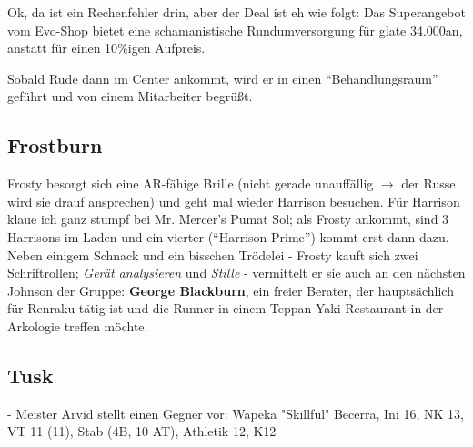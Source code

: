 Ok, da ist ein Rechenfehler drin, aber der Deal ist eh wie folgt: Das Superangebot vom Evo-Shop bietet eine schamanistische Rundumversorgung für glate 34.000\nuyen an, anstatt für einen 10\%igen Aufpreis.

Sobald Rude dann im Center ankommt, wird er in einen ``Behandlungsraum'' geführt und von einem Mitarbeiter begrüßt.
    


\subsection{Frostburn}

Frosty besorgt sich eine AR-fähige Brille (nicht gerade unauffällig $\rightarrow$ der Russe wird sie drauf ansprechen) und geht mal wieder Harrison besuchen. Für Harrison klaue ich ganz stumpf bei Mr. Mercer's Pumat Sol; als Frosty ankommt, sind 3 Harrisons im Laden und ein vierter (``Harrison Prime'') kommt erst dann dazu. Neben einigem Schnack und ein bisschen Trödelei - Frosty kauft sich zwei Schriftrollen; \textit{Gerät analysieren} und \textit{Stille} - vermittelt er sie auch an den nächsten Johnson der Gruppe: \textbf{George Blackburn}, ein freier Berater, der hauptsächlich für Renraku tätig ist und die Runner in einem Teppan-Yaki Restaurant in der Arkologie treffen möchte.


\subsection{Tusk}

    - Meister Arvid stellt einen Gegner vor: 
    Wapeka "Skillful" Becerra,
    Ini 16, 
    NK 13, 
    VT 11 (11), 
    Stab (4B, 10 AT), 
    Athletik 12, 
    K12
    
